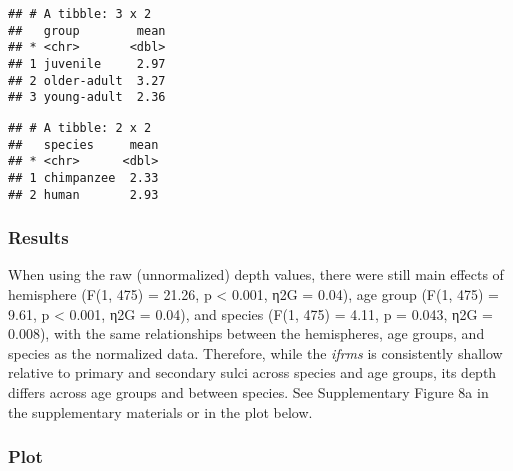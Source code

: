 \documentclass[
]{article}
\newenvironment{Shaded}{\begin{snugshade}}{\end{snugshade}}
\newcommand{\CommentTok}[1]{\textcolor[rgb]{0.56,0.35,0.01}{\textit{#1}}}
\newcommand{\DataTypeTok}[1]{\textcolor[rgb]{0.13,0.29,0.53}{#1}}
\newcommand{\KeywordTok}[1]{\textcolor[rgb]{0.13,0.29,0.53}{\textbf{#1}}}
\newcommand{\NormalTok}[1]{#1}
\newcommand{\OperatorTok}[1]{\textcolor[rgb]{0.81,0.36,0.00}{\textbf{#1}}}
\newcommand{\StringTok}[1]{\textcolor[rgb]{0.31,0.60,0.02}{#1}}
\begin{document}
\begin{verbatim}
## # A tibble: 3 x 2
##   group        mean
## * <chr>       <dbl>
## 1 juvenile     2.97
## 2 older-adult  3.27
## 3 young-adult  2.36
\end{verbatim}

\begin{Shaded}
\end{Shaded}

\begin{verbatim}
## # A tibble: 2 x 2
##   species     mean
## * <chr>      <dbl>
## 1 chimpanzee  2.33
## 2 human       2.93
\end{verbatim}

\hypertarget{results}{%
\subsubsection{Results}\label{results}}

When using the raw (unnormalized) depth values, there were still main
effects of hemisphere (F(1, 475) = 21.26, p \textless{} 0.001, η2G =
0.04), age group (F(1, 475) = 9.61, p \textless{} 0.001, η2G = 0.04),
and species (F(1, 475) = 4.11, p = 0.043, η2G = 0.008), with the same
relationships between the hemispheres, age groups, and species as the
normalized data. Therefore, while the \emph{ifrms} is consistently
shallow relative to primary and secondary sulci across species and age
groups, its depth differs across age groups and between species. See
Supplementary Figure 8a in the supplementary materials or in the plot
below.

\hypertarget{plot}{%
\subsubsection{Plot}\label{plot}}

\begin{Shaded}
\end{Shaded}
\end{document}
